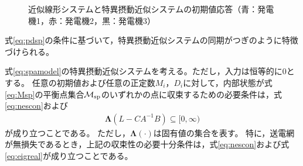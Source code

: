 \documentclass[tombow,dvipdfmx]{corona-a5}
\begin{document}
\begin{figure}[t]
{\begin{minipage}{0.32\linewidth}
  \end{minipage}
  \caption{近似線形システムと特異摂動近似システムの初期値応答（青：発電機1，赤：発電機2，黒：発電機3）}
  \label{fig:timeexsp}
  }
\end{figure}

式\ref{eq:pdsp}の条件に基づいて，特異摂動近似システムの同期がつぎのように特徴づけられる。

\begin{定理}\label{thm:2ndsys}
式\ref{eq:spamodel}の特異摂動近似システムを考える。ただし，入力は恒等的に0とする。
任意の初期値および任意の正定数$M_i$，$D_i$に対して，内部状態が式\ref{eq:Msp}の平衡点集合$\mathcal{M}_{\rm sp}$のいずれかの点に収束するための必要条件は，式\ref{eq:nescon}および
\begin{align}\label{eq:eigreal}
\bm{\Lambda}(L-CA^{-1}B)\subseteq [0,\infty)
\end{align}
が成り立つことである。
ただし，$\bm{\Lambda}(\cdot)$は固有値の集合を表す。
特に，送電網が無損失であるとき，上記の収束性の必要十分条件は，式\ref{eq:nescon}および式\ref{eq:eigreal}が成り立つことである。
\end{定理}
\end{document}
